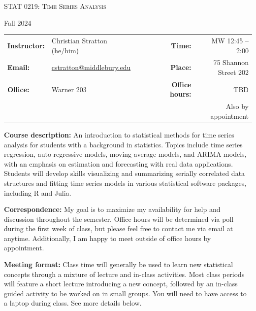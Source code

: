 \documentclass[11pt, a4paper]{article}
\begin{document}
\begin{center}
{\Large \textsc{STAT 0219: Time Series Analysis}}
\end{center}
\begin{center}
Fall 2024
\end{center}

\begin{framed}
\begin{tabular}{llcccrr}
\textbf{Instructor:} & Christian Stratton (he/him) & & &  & \textbf{Time:} & MW 12:45 -- 2:00  \\
\textbf{Email:} &  \href{mailto:cstratton@middlebury.edu}{cstratton@middlebury.edu} & & & & \textbf{Place:} & 75 Shannon Street 202 \\
\textbf{Office:} & Warner 203 & & & & \textbf{Office hours:} & TBD \\
& & & & & & Also by appointment \\
\end{tabular}
\end{framed}

\noindent \textbf{Course description:} An introduction to statistical
methods for time series analysis for students with a background in
statistics. Topics include time series regression, auto-regressive
models, moving average models, and ARIMA models, with an emphasis on
estimation and forecasting with real data applications. Students will
develop skills visualizing and summarizing serially correlated data
structures and fitting time series models in various statistical
software packages, including R and Julia.

\vspace{4mm}

\noindent \textbf{Correspondence:} My goal is to maximize my
availability for help and discussion throughout the semester. Office
hours will be determined via poll during the first week of class, but
please feel free to contact me via email at anytime. Additionally, I am
happy to meet outside of office hours by appointment.

\vspace{4mm}

\noindent \textbf{Meeting format:} Class time will generally be used to
learn new statistical concepts through a mixture of lecture and in-class
activities. Most class periods will feature a short lecture introducing
a new concept, followed by an in-class guided activity to be worked on
in small groups. You will need to have access to a laptop during class.
See more details below.
\end{document}
